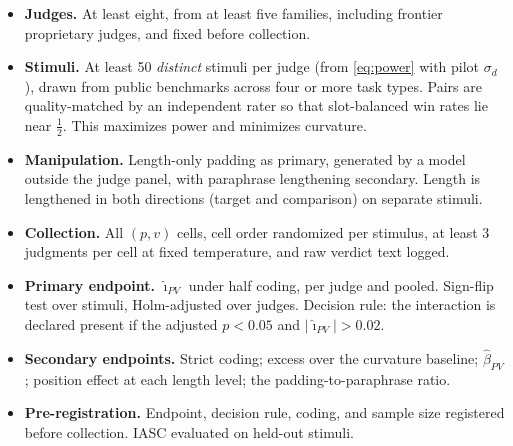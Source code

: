 \documentclass[10pt]{article}
\theoremstyle{remark}
\newcommand{\hiPV}{\hat\imath_{PV}}
\begin{document}
\begin{itemize}[leftmargin=*,itemsep=2pt]
\item \textbf{Judges.} At least eight, from at least five families,
  including frontier proprietary judges, and fixed before collection.
\item \textbf{Stimuli.} At least 50 \emph{distinct} stimuli per judge
  (from \eqref{eq:power} with pilot $\sigma_d$), drawn from public
  benchmarks across four or more task types. Pairs are quality-matched
  by an independent rater so that slot-balanced win rates lie near
  $\tfrac12$. This maximizes power and minimizes curvature.
\item \textbf{Manipulation.} Length-only padding as primary, generated
  by a model outside the judge panel, with paraphrase lengthening
  secondary. Length is lengthened in both directions (target and
  comparison) on separate stimuli.
\item \textbf{Collection.} All $(p,v)$ cells, cell order randomized per
  stimulus, at least 3 judgments per cell at fixed temperature, and raw
  verdict text logged.
\item \textbf{Primary endpoint.} $\hiPV$ under half coding, per judge
  and pooled. Sign-flip test over stimuli, Holm-adjusted over judges.
  Decision rule: the interaction is declared present if the adjusted
  $p<0.05$ and $|\hiPV|>0.02$.
\item \textbf{Secondary endpoints.} Strict coding; excess over the
  curvature baseline; $\hat\beta_{PV}$; position effect at each length
  level; the padding-to-paraphrase ratio.
\item \textbf{Pre-registration.} Endpoint, decision rule, coding, and
  sample size registered before collection. IASC evaluated on held-out
  stimuli.
\end{itemize}
\end{document}
